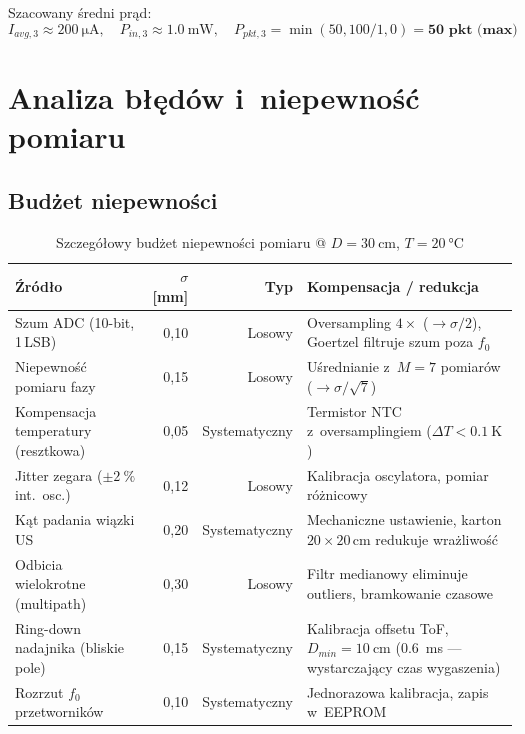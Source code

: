 \documentclass[a4paper,11pt]{article}
\begin{document}
Szacowany średni prąd:
\begin{equation}
    I_{avg,3} \approx \SI{200}{\micro\ampere}, \quad
    P_{in,3} \approx \SI{1,0}{\milli\watt}, \quad
    P_{pkt,3} = \min(50, 100/1{,}0) = \textbf{50~pkt~(max)}
    \label{eq:moc_scen3}
\end{equation}


\section{Analiza błędów i~niepewność pomiaru}
\label{sec:bledy}

\subsection{Budżet niepewności}

\begin{table}[H]
    \centering
    \caption{Szczegółowy budżet niepewności pomiaru @ $D = \SI{30}{\centi\metre}$, $T = \SI{20}{\celsius}$}
    \label{tab:bledy}
    \begin{tabularx}{\textwidth}{lrrX}
        \toprule
        \textbf{Źródło} & \textbf{$\sigma$ [\si{\milli\metre}]} & \textbf{Typ}
            & \textbf{Kompensacja / redukcja} \\
        \midrule
        Szum ADC (10-bit, 1\,LSB)
            & 0,10
            & Losowy
            & Oversampling $4\times$ ($\to \sigma/2$), Goertzel filtruje szum poza $f_0$ \\
        Niepewność pomiaru fazy
            & 0,15
            & Losowy
            & Uśrednianie z~$M=7$ pomiarów ($\to \sigma/\sqrt{7}$) \\
        Kompensacja temperatury (resztkowa)
            & 0,05
            & Systematyczny
            & Termistor NTC z~oversamplingiem ($\Delta T < \SI{0,1}{\kelvin}$) \\
        Jitter zegara ($\pm\SI{2}{\percent}$ int.\ osc.)
            & 0,12
            & Losowy
            & Kalibracja oscylatora, pomiar różnicowy \\
        Kąt padania wiązki US
            & 0,20
            & Systematyczny
            & Mechaniczne ustawienie, karton $20\times20$\,cm redukuje wrażliwość \\
        Odbicia wielokrotne (multipath)
            & 0,30
            & Losowy
            & Filtr medianowy eliminuje outliers, bramkowanie czasowe \\
        Ring-down nadajnika (bliskie pole)
            & 0,15
            & Systematyczny
            & Kalibracja offsetu ToF, $D_{min} = \SI{10}{\centi\metre}$ (\SI{0,6}{\milli\second} --- wystarczający czas wygaszenia) \\
        Rozrzut $f_0$ przetworników
            & 0,10
            & Systematyczny
            & Jednorazowa kalibracja, zapis w~EEPROM \\
        \bottomrule
    \end{tabularx}
\end{table}
\end{document}
